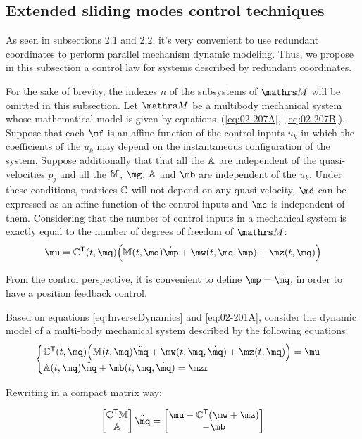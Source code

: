 \subsection{Extended sliding modes control techniques}\label{S02-4}

As seen in subsections 2.1 and 2.2, it's very convenient to use redundant coordinates to perform parallel mechanism dynamic modeling. Thus, we propose in this subsection a control law for systems described by redundant coordinates.

For the sake of brevity, the indexes $n$ of the subsystems of $\ssM$ will be omitted in this subsection. Let $\ssM$ be a multibody mechanical system whose mathematical model is given 
by equations~(\ref{eq:02-207A},~\ref{eq:02-207B}).
Suppose that each $\mf$ is an affine function of the control inputs $u_{k}$
in which the coefficients of the $u_{k}$ may depend on the instantaneous
configuration of the system.
Suppose additionally that that all the $\mathbb{A}$ are independent
of the quasi-velocities $p_{j}$ and all the $\mathbb{M}$, $\mg$, $\mathbb{A}$ and $\mb$ 
are independent of the $u_{k}$.
Under these conditions, matrices $\mathbb{C}$ will not depend on 
any quasi-velocity, $\md$ can be expressed as an affine function of the control inputs 
and $\mc$ is independent of them.
Considering that the number of control inputs in a mechanical system is
exactly equal to the number of degrees of freedom of $\ssM$:
\begin{equation} \label{eq:InverseDynamics}
\mu = \mC^\msT(t,\mq) \Big( \mM (t, \mq) \dot{\mp} + \mw(t,\mq,\mp) + \mz(t,\mq) \Big)
\end{equation}

From the control perspective, it is convenient to define $\mp = \dot \mq$, in order to have a position feedback control.

Based on equations \eqref{eq:InverseDynamics} and \eqref{eq:02-201A}, consider the dynamic model of a multi-body mechanical system described by the following equations:
\begin{equation} \label{eq:MechanicalSystem}
\begin{cases}
\mC^\msT (t, \mq) \Big( \mM (t, \mq) \ddot{\mq} + \mw (t, \mq, \dot{\mq}) + \mz (t, \mq) \Big) = \mu \\
\mA (t, \mq) \ddot{\mq} + \mb (t, \mq, \dot{\mq}) = \mzr
\end{cases}
\end{equation}

Rewriting in a compact matrix way:

\begin{equation} \label{eq:MechanicalSystemMatrix}
\begin{bmatrix}
\mC^\msT \mM \\
\mA
\end{bmatrix}
\ddot{\mq}
=
\begin{bmatrix}
\mu - \mC^\msT(\mw + \mz) \\
-\mb
\end{bmatrix}
\end{equation}

